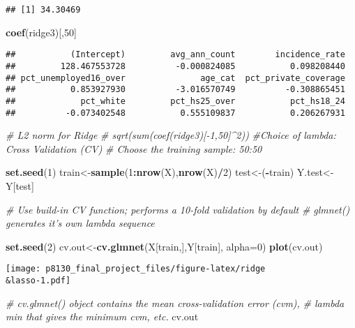 \documentclass[]{article}
\newenvironment{Shaded}{\begin{snugshade}}{\end{snugshade}}
\newcommand{\KeywordTok}[1]{\textcolor[rgb]{0.13,0.29,0.53}{\textbf{#1}}}
\newcommand{\DataTypeTok}[1]{\textcolor[rgb]{0.13,0.29,0.53}{#1}}
\newcommand{\DecValTok}[1]{\textcolor[rgb]{0.00,0.00,0.81}{#1}}
\newcommand{\CommentTok}[1]{\textcolor[rgb]{0.56,0.35,0.01}{\textit{#1}}}
\newcommand{\OperatorTok}[1]{\textcolor[rgb]{0.81,0.36,0.00}{\textbf{#1}}}
\newcommand{\NormalTok}[1]{#1}
\begin{document}
\begin{verbatim}
## [1] 34.30469
\end{verbatim}

\begin{Shaded}
\begin{Highlighting}[]
\KeywordTok{coef}\NormalTok{(ridge3)[,}\DecValTok{50}\NormalTok{]}
\end{Highlighting}
\end{Shaded}

\begin{verbatim}
##           (Intercept)         avg_ann_count        incidence_rate 
##         128.467553728          -0.000824085           0.098208440 
## pct_unemployed16_over               age_cat  pct_private_coverage 
##           0.853927930          -3.016570749          -0.308865451 
##             pct_white         pct_hs25_over           pct_hs18_24 
##          -0.073402548           0.555109837           0.206267931
\end{verbatim}

\begin{Shaded}
\begin{Highlighting}[]
\CommentTok{# L2 norm for Ridge}
\CommentTok{# sqrt(sum(coef(ridge3)[-1,50]^2))}
\CommentTok{#Choice of lambda: Cross Validation (CV)}
\CommentTok{# Choose the training sample: 50:50}

\KeywordTok{set.seed}\NormalTok{(}\DecValTok{1}\NormalTok{)}
\NormalTok{train<-}\KeywordTok{sample}\NormalTok{(}\DecValTok{1}\OperatorTok{:}\KeywordTok{nrow}\NormalTok{(X),}\KeywordTok{nrow}\NormalTok{(X)}\OperatorTok{/}\DecValTok{2}\NormalTok{)}
\NormalTok{test<-(}\OperatorTok{-}\NormalTok{train)}
\NormalTok{Y.test<-Y[test]}

\CommentTok{# Use build-in CV function; performs a 10-fold validation by default}
\CommentTok{# glmnet() generates it's own lambda sequence}

\KeywordTok{set.seed}\NormalTok{(}\DecValTok{2}\NormalTok{)}
\NormalTok{cv.out<-}\KeywordTok{cv.glmnet}\NormalTok{(X[train,],Y[train], }\DataTypeTok{alpha=}\DecValTok{0}\NormalTok{)}
\KeywordTok{plot}\NormalTok{(cv.out)}
\end{Highlighting}
\end{Shaded}

\texttt{[image: p8130\_final\_project\_files/figure-latex/ridge\\\&lasso-1.pdf]}

\begin{Shaded}
\begin{Highlighting}[]
\CommentTok{# cv.glmnet() object contains the mean cross-validation error (cvm),}
\CommentTok{# lambda min that gives the minimum cvm, etc.}
\NormalTok{cv.out}
\end{Highlighting}
\end{Shaded}
\end{document}
